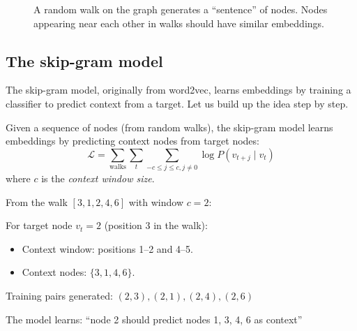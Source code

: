 \begin{notechapter}
\begin{figure}[htbp]
\caption{A random walk on the graph generates a ``sentence'' of nodes. Nodes appearing near each other in walks should have similar embeddings.}
\label{shallow-embeddings:fig:random_walk}
\end{figure}

\subsection{The skip-gram model}

The skip-gram model, originally from word2vec, learns embeddings by training a classifier to predict context from a target. Let us build up the idea step by step.

\begin{definition}
Given a sequence of nodes (from random walks), the skip-gram model learns embeddings by predicting context nodes from target nodes:
\[
\mathcal{L} = \sum_{\text{walks}} \sum_{t} \sum_{-c \leq j \leq c, j \neq 0} \log P(v_{t+j} \mid v_t)
\]
where $c$ is the \emph{context window size}.
\end{definition}

\begin{example}
From the walk $[3, 1, 2, 4, 6]$ with window $c = 2$:

For target node $v_t = 2$ (position 3 in the walk):
\begin{itemize}
    \item Context window: positions 1--2 and 4--5.
    \item Context nodes: $\{3, 1, 4, 6\}$.
\end{itemize}

Training pairs generated: $(2, 3), (2, 1), (2, 4), (2, 6)$

The model learns: ``node 2 should predict nodes 1, 3, 4, 6 as context''
\end{example}


\end{notechapter}
